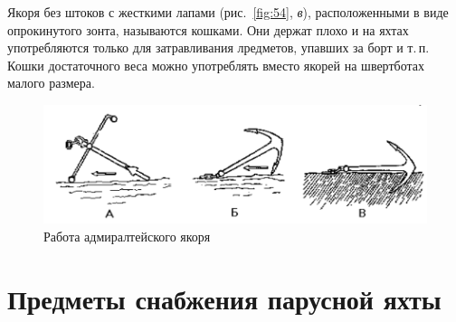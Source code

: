 \documentclass[a4paper, 12pt, twoside, final]{scrbook}
\begin{document}
Якоря без штоков с жесткими лапами (рис.~\ref{fig:54}, \textit{в}), расположенными в виде опрокинутого зонта, называются кошками. Они держат плохо и на яхтах употребляются только для затравливания лредметов, упавших за борт и т.\,п. Кошки достаточного веса можно употреблять вместо якорей на швертботах малого размера.

\begin{figure}[htbp]
   \centering
   \includegraphics{53_Rabota_admiraltejskogo_jakorja} %
   \caption{Работа адмиралтейского якоря}
   \label{fig:53}
\end{figure}

\section{Предметы снабжения парусной яхты}
\end{document}

